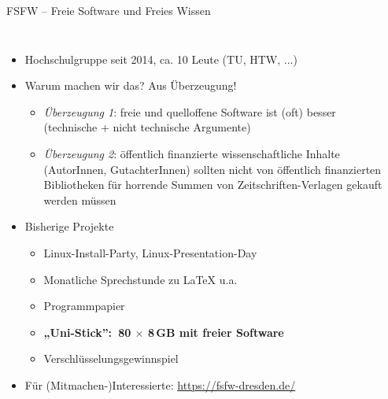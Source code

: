 \documentclass{beamer}
\begin{document}
\begin{frame}[label=ct1]{FSFW – Freie Software und Freies Wissen}

  \begin{columns}
 
\vspace{-5mm}

  \begin{itemize}
  \item Hochschulgruppe seit 2014, ca. 10 Leute (TU, HTW, ...)
  \item Warum machen wir das? Aus Überzeugung!


  \begin{itemize}
  \item \emph{Überzeugung 1}: freie und quelloffene Software ist (oft) besser\\
    (technische + nicht technische Argumente)\\
    \bigskip
    \pause
  \item \emph{Überzeugung 2}: öffentlich finanzierte wissenschaftliche Inhalte
    (AutorInnen, GutachterInnen) sollten nicht von öffentlich finanzierten
    Bibliotheken für horrende Summen von Zeitschriften-Verlagen gekauft werden
    müssen
  \end{itemize}

    \pause
  \item Bisherige Projekte
    \begin{itemize}
    \item Linux-Install-Party, Linux-Presentation-Day
    \item Monatliche Sprechstunde zu \LaTeX{} u.a.
    \item Programmpapier
    \item \textbf<4-5>{„Uni-Stick”:~80 $\times$ 8\,GB mit freier Software}
    \item Verschlüsselungsgewinnspiel
    \end{itemize}
    \pause
    \pause
    \pause
    \item Für (Mitmachen-)Interessierte: \url{https://fsfw-dresden.de/}
  \end{itemize}
  

\end{columns}
\end{frame}
\end{document}
